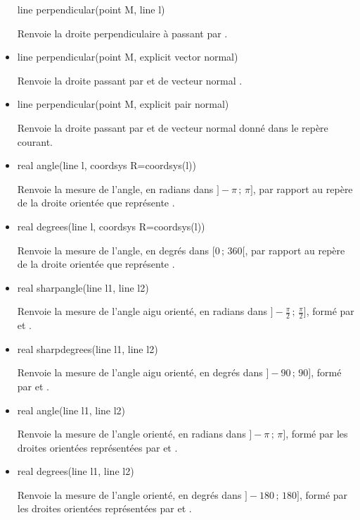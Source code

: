 \documentclass[pdftex]{article}
\begin{document}
\begin{itemize}
    \begin{Vcolor}
    line perpendicular(point M, line l)
  \end{Vcolor}
  Renvoie la droite perpendiculaire à  passant par .
\item {}%
    \begin{Vcolor}
    line perpendicular(point M, explicit vector normal)
  \end{Vcolor}
  Renvoie la droite passant par  et de vecteur normal .
\item {}%
    \begin{Vcolor}
    line perpendicular(point M, explicit pair normal)
  \end{Vcolor}
  Renvoie la droite passant par  et de vecteur
  normal  donné dans le repère courant\linebreak{}.
\item {}%
    \begin{Vcolor}
    real angle(line l, coordsys R=coordsys(l))
  \end{Vcolor}
  Renvoie la mesure de l'angle, en radians dans $]-\pi\,;\,\pi]$, par rapport au
  repère  de la droite orientée que représente .
\item {}%
    \begin{Vcolor}
    real degrees(line l, coordsys R=coordsys(l))
  \end{Vcolor}
  Renvoie la mesure de l'angle, en degrés dans $[0\,;\,360[$, par rapport au
  repère  de la droite orientée que représente .
\item {}%
    \begin{Vcolor}
    real sharpangle(line l1, line l2)
  \end{Vcolor}
  Renvoie la mesure de l'angle aigu orienté, en radians dans
  $]-\frac{\pi}{2}\,;\,\frac{\pi}{2}]$, formé par  et .
\item {}%
    \begin{Vcolor}
    real sharpdegrees(line l1, line l2)
  \end{Vcolor}
  Renvoie la mesure de l'angle aigu orienté, en degrés dans
  $]-90\,;\,90]$, formé par  et .
\item {}%
    \begin{Vcolor}
    real angle(line l1, line l2)
  \end{Vcolor}
  Renvoie la mesure de l'angle orienté, en radians dans
  $]-\pi\,;\,\pi]$, formé par les droites orientées représentées par  et .
\item {}%
    \begin{Vcolor}
    real degrees(line l1, line l2)
  \end{Vcolor}
  Renvoie la mesure de l'angle orienté, en degrés dans
  $]-180\,;\,180]$, formé par les droites orientées représentées par  et .
\end{itemize}
\end{document}
